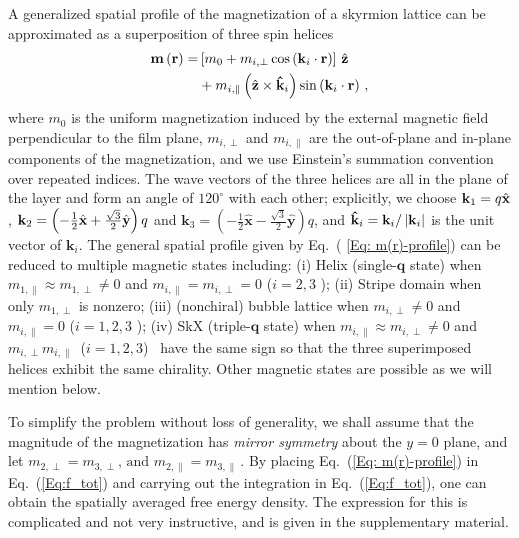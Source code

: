 \documentclass[10pt,onecolumn,prb,aps,notitlepage]{revtex4}
\begin{document}
A generalized spatial profile of the magnetization of a skyrmion lattice can
be approximated as a superposition of three spin helices~\cite%
{Muhlbauer09Sci_skyrmion,Nagaosa13Nat.Nano_Skyrmion}
\begin{align}
\mathbf{m}\left( \mathbf{r}\right)  =&\left[ m_{0}+m_{i,\perp
}\cos \left( \mathbf{k}_{i}\cdot \mathbf{r}\right) \right] \,\hat{\mathbf{z}}%
\notag \\
&+m_{i,\parallel }\left( \hat{\mathbf{z}}\times \mathbf{\hat{k%
}}_{i}\right) \sin \left( \mathbf{k}_{i}\cdot \mathbf{r}\right)\,,  \label{Eq: m(r)-profile}
\end{align}%
where $m_{0}$ is the uniform magnetization induced by the external magnetic
field perpendicular to the film plane, $m_{i,\perp }$ and $%
m_{i,\parallel }$ are the out-of-plane and in-plane components of the
magnetization, and we use Einstein's summation convention over repeated indices. %
The wave vectors of the three helices are all in the plane of
the layer and form an angle of $%
120^{\circ }$ with each other; explicitly, we choose $\mathbf{k}_{1}=q\hat{%
\mathbf{x}}$, $\mathbf{k}_{2}=\left( -\frac{1}{2}\hat{\mathbf{x}}+\frac{%
\sqrt{3}}{2}\hat{\mathbf{y}}\right) q$ and $\mathbf{k}_{3}=\left( -\frac{1}{2%
}\hat{\mathbf{x}}-\frac{\sqrt{3}}{2}\hat{\mathbf{y}}\right) q$, and $\mathbf{%
\hat{k}}_{i}=\mathbf{k}_{i}/\left\vert \mathbf{k}_{i}\right\vert $ is the
unit vector of $\mathbf{k}_{i}$. The general spatial profile given by Eq.~(%
\ref{Eq: m(r)-profile}) can be reduced to multiple magnetic states
including: (i) Helix (single-$\mathbf{q}$ state) when $m_{1,\parallel
}\approx m_{1,\perp }\neq 0$ and $m_{i,\parallel }=m_{i,\perp }=0$ ($i=2,3$%
); (ii) Stripe domain when only $m_{1,\perp }$ is nonzero; (iii) (nonchiral)
bubble lattice when $m_{i,\perp }\neq 0$ and $m_{i,\parallel }=0$ ($i=1,2,3$%
); (iv) SkX (triple-$\mathbf{q}$ state) when $m_{i,\parallel }\approx
m_{i,\perp }\neq 0$ and $m_{i,\perp }m_{i,\parallel }$\textit{\ }($i=1,2,3$)%
\textit{\ }have the same sign so that the three superimposed helices exhibit
the same chirality. Other magnetic states are possible as we will mention
below.

To simplify the problem without loss of generality, we shall assume that the
magnitude of the magnetization has \textit{mirror symmetry} about the $y=0$
plane, and let $
m_{2,\perp }=m_{3,\perp }\text{, and }m_{2,\parallel }=m_{3,\parallel }\,.
$
By placing Eq.~(\ref{Eq: m(r)-profile}) in Eq.~(\ref{Eq:f_tot}) and carrying out the integration in
Eq.~(\ref{Eq:f_tot}), one can obtain the spatially averaged free energy density. The expression for this is complicated and not very instructive, and is given in the supplementary material.
\end{document}
